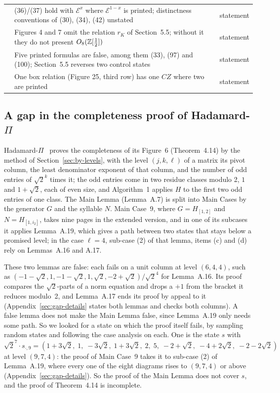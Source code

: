 \begin{table}
\begin{tabularx}{\linewidth}{@{}l Y l@{}}
 & (36)/(37) hold with $\mathcal{E}^{x}$ where $\mathcal{E}^{1-x}$ is printed; distinctness conventions of (30), (34), (42) unstated & statement \\
\citet{amy2024toffoli} & Figures 4 and 7 omit the relation $r_K$ of Section~5.5; without it they do not present $O_8(\mathbb{Z}[\frac12])$ & statement \\
 & Five printed formulas are false, among them (33), (97) and (100); Section~5.5 reverses two control states & statement \\
\citet{li2025qutrit} & One box relation (Figure 25, third row) has one $CZ$ where two are printed & statement \\
\bottomrule
\end{tabularx}
\end{table}

\subsection{A gap in the completeness proof of Hadamard-\texorpdfstring{$\Pi$}{Pi}}\label{sec:gap}

Hadamard-$\Pi$~\cite{fang2026hadamard} proves the completeness of its
Figure~6 (Theorem~4.14) by the method of Section~\ref{sec:by-levels},
with the level $(j,k,\ell)$ of a matrix its pivot column, the least
denominator exponent of that column, and the number of odd entries of
$\sqrt2^k$ times it; the odd entries come in two residue classes
modulo 2, $1$ and $1+\sqrt2$, each of even size, and Algorithm~1
applies $H$ to the first two odd entries of one class. The Main Lemma
(Lemma~A.7) is split into Main Cases by the generator $G$ and the
syllable $N$. Main Case~9, where $G=H_{[1,2]}$ and $N=H_{[1,i_2]}$, takes
nine pages in the extended version, and in one of its subcases it
applies Lemma~A.19, which gives a path between two states that stays
below a promised level; in the case $\ell=4$, sub-case (2) of that
lemma, items (c) and (d) rely on Lemmas~A.16 and A.17.

These two lemmas are false: each fails on a unit column at level
$(6,4,4)$, such as
$(-1-\sqrt2, 1, -1-\sqrt2, 1, \sqrt2, -2+\sqrt2)/\sqrt2^4$ for
Lemma~A.16. Its proof compares the $\sqrt2$-parts of a norm equation
and drops a $+1$ from the bracket it reduces modulo~2, and Lemma~A.17
ends its proof by appeal to it (Appendix~\ref{sec:gap-details} states
both lemmas and checks both columns). A false lemma does not make the
Main Lemma false, since Lemma~A.19 only needs some path. So we looked
for a state on which the proof itself fails, by sampling random states
and following the case analysis on each. One is the state $s$ with
\[
\sqrt2^7\cdot s_{\cdot,9} = (1+3\sqrt2,\; 1,\; -3\sqrt2,\; 1+3\sqrt2,\; 2,\; 5,\; -2+\sqrt2,\; -4+2\sqrt2,\; -2-2\sqrt2)
\]
at level $(9,7,4)$: the proof of Main Case~9 takes it to sub-case (2)
of Lemma~A.19, where every one of the eight diagrams rises to
$(9,7,4)$ or above (Appendix~\ref{sec:gap-details}). So the proof of
the Main Lemma does not cover $s$, and the proof of Theorem~4.14 is
incomplete.

